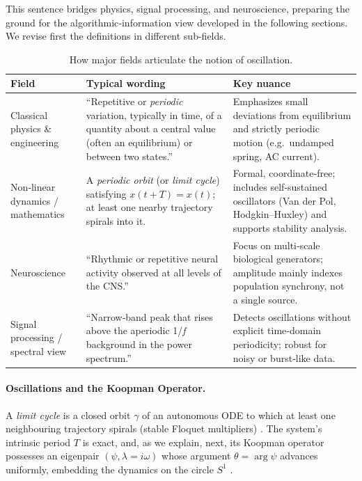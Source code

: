 This sentence bridges physics, signal processing, and neuroscience, preparing the ground for the algorithmic‑information view developed in the following sections. We revise first the definitions in different sub-fields.






\begin{table}[t!]\small
\centering
\caption{How major fields articulate the notion of oscillation.}
\label{tab:field_views}
\begin{tabular}{p{3.2cm}p{6.5cm}p{4.3cm}} 
\toprule
\textbf{Field} & \textbf{Typical wording} & \textbf{Key nuance} \\
\midrule
Classical physics \& engineering &
``Repetitive or \emph{periodic} variation, typically in time, of a quantity about a central value (often an equilibrium) or between two states.'' \cite{Kreyszig11}  &
Emphasizes small deviations from equilibrium and strictly periodic motion (e.g.\ undamped spring, AC current). \\[4pt]

Non‑linear dynamics / mathematics &
A \emph{periodic orbit} (or \emph{limit cycle}) satisfying $x(t+T)=x(t)$; at least one nearby trajectory spirals into it.\cite{Strogatz1994} &
Formal, coordinate‑free; includes self‑sustained oscillators (Van der Pol, Hodgkin–Huxley) and supports stability analysis. \\[4pt]

Neuroscience &
``Rhythmic or repetitive neural activity observed at all levels of the CNS.''  \cite{Basar13}&
Focus on multi‑scale biological generators; amplitude mainly indexes population synchrony, not a single source. \\[4pt]

Signal processing / spectral view &
``Narrow‑band peak that rises above the aperiodic 1/\emph{f} background in the power spectrum.'' \cite{Donoghue20}&
Detects oscillations without explicit time‑domain periodicity; robust for noisy or burst‑like data. \\
\bottomrule
\end{tabular}
\vspace{-6pt}
\end{table}




\paragraph{Oscillations and the Koopman Operator.}
A \textit{limit cycle} is a closed orbit $\gamma$ of an autonomous ODE to which at least one neighbouring trajectory spirals (stable Floquet multipliers) \cite{Strogatz94}. The system’s intrinsic period $T$ is exact, and, as we explain, next, its Koopman operator possesses an eigenpair $(\psi,\lambda=i\omega)$ whose argument $\theta=\arg\psi$ advances uniformly, embedding the dynamics on the circle $S^{1}$ \cite{Koopman31}.  

